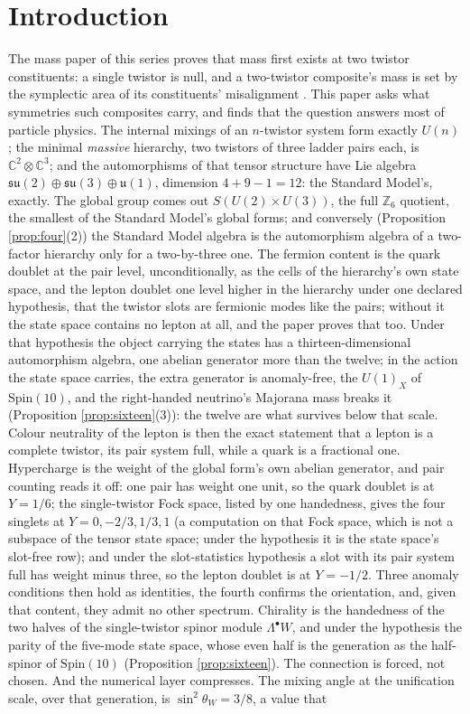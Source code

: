 \documentclass[11pt]{article}
\theoremstyle{definition}
\newcommand{\C}{\mathbb{C}}
\newcommand{\su}{\mathfrak{su}}
\newcommand{\uu}{\mathfrak{u}}
\begin{document}
\newpage
\section{Introduction}\label{sec:intro}

The mass paper of this series proves that mass first exists at two twistor constituents: a single twistor is null, and a two-twistor composite's mass is set by the symplectic area of its constituents' misalignment \cite{ButlerT11}. This paper asks what symmetries such composites carry, and finds that the question answers most of particle physics. The internal mixings of an $n$-twistor system form exactly $U(n)$; the minimal \emph{massive} hierarchy, two twistors of three ladder pairs each, is $\C^{2} \otimes \C^{3}$; and the automorphisms of that tensor structure have Lie algebra $\su(2) \oplus \su(3) \oplus \uu(1)$, dimension $4 + 9 - 1 = 12$: the Standard Model's, exactly. The global group comes out $S(U(2) \times U(3))$, the full $\mathbb{Z}_{6}$ quotient, the smallest of the Standard Model's global forms; and conversely (Proposition \ref{prop:four}(2)) the Standard Model algebra is the automorphism algebra of a two-factor hierarchy only for a two-by-three one. The fermion content is the quark doublet at the pair level, unconditionally, as the cells of the hierarchy's own state space, and the lepton doublet one level higher in the hierarchy under one declared hypothesis, that the twistor slots are fermionic modes like the pairs; without it the state space contains no lepton at all, and the paper proves that too. Under that hypothesis the object carrying the states has a thirteen-dimensional automorphism algebra, one abelian generator more than the twelve; in the action the state space carries, the extra generator is anomaly-free, the $U(1)_{X}$ of $\mathrm{Spin}(10)$, and the right-handed neutrino's Majorana mass breaks it (Proposition \ref{prop:sixteen}(3)): the twelve are what survives below that scale. Colour neutrality of the lepton is then the exact statement that a lepton is a complete twistor, its pair system full, while a quark is a fractional one. Hypercharge is the weight of the global form's own abelian generator, and pair counting reads it off: one pair has weight one unit, so the quark doublet is at $Y = 1/6$; the single-twistor Fock space, listed by one handedness, gives the four singlets at $Y = 0, -2/3, 1/3, 1$ (a computation on that Fock space, which is not a subspace of the tensor state space; under the hypothesis it is the state space's slot-free row); and under the slot-statistics hypothesis a slot with its pair system full has weight minus three, so the lepton doublet is at $Y = -1/2$. Three anomaly conditions then hold as identities, the fourth confirms the orientation, and, given that content, they admit no other spectrum. Chirality is the handedness of the two halves of the single-twistor spinor module $\Lambda^{\bullet}W$, and under the hypothesis the parity of the five-mode state space, whose even half is the generation as the half-spinor of $\mathrm{Spin}(10)$ (Proposition \ref{prop:sixteen}). The connection is forced, not chosen. And the numerical layer compresses. The mixing angle at the unification scale, over that generation, is $\sin^{2}\theta_{W} = 3/8$, a value that 
\end{document}
